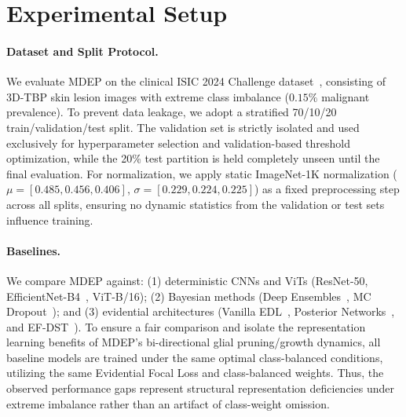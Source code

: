 \documentclass[letterpaper]{article} %
\begin{document}
\section{Experimental Setup}\label{sec:experiment}

\paragraph{Dataset and Split Protocol.} We evaluate MDEP on the clinical ISIC 2024 Challenge dataset~\cite{isic2024}, consisting of 3D-TBP skin lesion images with extreme class imbalance ($0.15\%$ malignant prevalence). To prevent data leakage, we adopt a stratified 70/10/20 train/validation/test split. The validation set is strictly isolated and used exclusively for hyperparameter selection and validation-based threshold optimization, while the 20\% test partition is held completely unseen until the final evaluation. For normalization, we apply static ImageNet-1K normalization ($\mu = [0.485, 0.456, 0.406]$, $\sigma = [0.229, 0.224, 0.225]$) as a fixed preprocessing step across all splits, ensuring no dynamic statistics from the validation or test sets influence training.

\paragraph{Baselines.} We compare MDEP against: (1) deterministic CNNs and ViTs (ResNet-50, EfficientNet-B4~\cite{tan2019efficientnet}, ViT-B/16); (2) Bayesian methods (Deep Ensembles~\cite{lakshminarayanan2017simple}, MC Dropout~\cite{gal2016dropout}); and (3) evidential architectures (Vanilla EDL~\cite{sensoy2018evidential}, Posterior Networks~\cite{charpentier2020posterior}, and EF-DST~\cite{sensoy2018evidential, evci2020rigging}). To ensure a fair comparison and isolate the representation learning benefits of MDEP's bi-directional glial pruning/growth dynamics, all baseline models are trained under the same optimal class-balanced conditions, utilizing the same Evidential Focal Loss and class-balanced weights. Thus, the observed performance gaps represent structural representation deficiencies under extreme imbalance rather than an artifact of class-weight omission.
\end{document}
